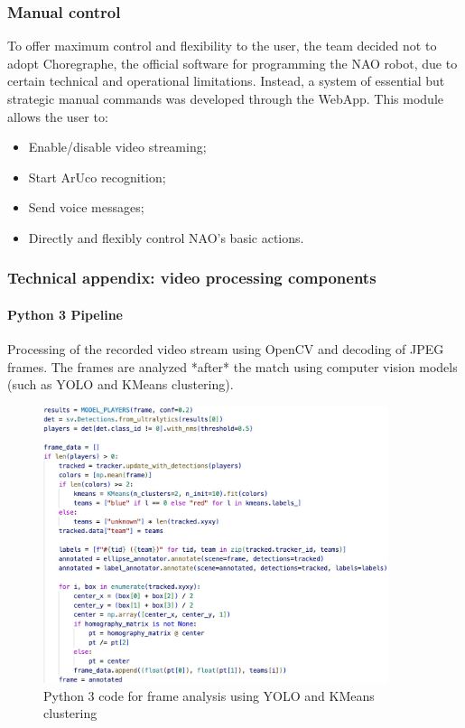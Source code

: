 \documentclass{optica-article}
\begin{document}
\subsubsection*{Manual control}
To offer maximum control and flexibility to the user, the team decided not to adopt Choregraphe, the official software for programming the NAO robot, due to certain technical and operational limitations. Instead, a system of essential but strategic manual commands was developed through the WebApp. This module allows the user to:

\begin{itemize}
  \item Enable/disable video streaming;
  \item Start ArUco recognition;
  \item Send voice messages;
  \item Directly and flexibly control NAO's basic actions.
\end{itemize}

\subsubsection*{Technical appendix: video processing components}

\paragraph{Python 3 Pipeline}
Processing of the recorded video stream using OpenCV and decoding of JPEG frames. The frames are analyzed *after* the match using computer vision models (such as YOLO and KMeans clustering).

\FloatBarrier

\begin{figure} [H]
\centering
\includegraphics[width=0.9\textwidth]{figures/kmeans.jpg}
\caption{Python 3 code for frame analysis using YOLO and KMeans clustering}
\label{fig:enter-label}
\end{figure}
\end{document}
